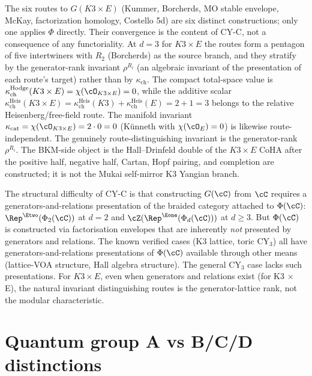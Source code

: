\begin{remark}
\label{rem:cy-c-pentagon}
The six routes to $G(K3 \times E)$ (Kummer, Borcherds, MO stable
envelope, McKay, factorization homology, Costello 5d) are six
distinct constructions; only one applies $\Phi$ directly. Their
convergence is the content of CY-C, not a consequence of any
functoriality. At $d = 3$ for
$K3 \times E$ the routes form a pentagon of five intertwiners with
$R_2$ (Borcherds) as the source branch, and they stratify by the
generator-rank invariant $\rho^{R_i}$ (an algebraic invariant of
the presentation of each route's target) rather than by
$\kappa_{\mathrm{ch}}$. The compact total-space value is
$\kappa_{\mathrm{ch}}^{\mathrm{Hodge}}(K3\times E)=\chi(\cO_{K3\times E})=0$,
while the additive scalar
$\kappa_{\mathrm{ch}}^{\mathrm{Heis}}(K3\times E)
=\kappa_{\mathrm{ch}}^{\mathrm{Heis}}(K3)
+\kappa_{\mathrm{ch}}^{\mathrm{Heis}}(E)=2+1=3$
belongs to the relative Heisenberg/free-field route. The
manifold invariant $\kappa_{\mathrm{cat}} = \chi(\cO_{K3 \times E})
= 2 \cdot 0 = 0$ (K\"unneth with $\chi(\cO_E) = 0$) is likewise
route-independent. The genuinely route-distinguishing invariant is the
generator-rank $\rho^{R_i}$. The BKM-side object is the
Hall--Drinfeld double of the $K3\times E$ CoHA after the positive half,
negative half, Cartan, Hopf pairing, and completion are constructed; it
is not the Mukai self-mirror K3 Yangian branch.
\end{remark}

\begin{remark}
\label{rem:why-cy-c-hard}
The structural difficulty of CY-C is that constructing $G(\cC)$
from $\cC$ requires a generators-and-relations presentation
of the braided category attached to $\Phi(\cC)$: $\Rep^{\Etwo}(\Phi_2(\cC))$
at $d=2$ and $\cZ(\Rep^{\Eone}(\Phi_d(\cC)))$ at $d\geq3$. But $\Phi(\cC)$
is constructed via factorisation envelopes that are inherently
\emph{not} presented by generators and relations. The known
verified cases (K3 lattice, toric CY$_3$) all have
generators-and-relations presentations of $\Phi(\cC)$ available
through other means (lattice-VOA structure, Hall algebra
structure). The general CY$_3$ case lacks such presentations.
For $K3 \times E$, even when generators and
relations exist (for K3 $\times$ E), the natural invariant
distinguishing routes is the generator-lattice rank, not the
modular characteristic.
\end{remark}


\section{Quantum group A vs B/C/D distinctions}
\label{sec:qg-abcd-distinctions}

